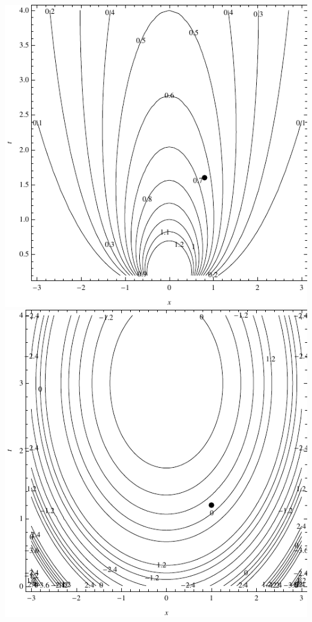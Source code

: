 \documentclass[12pt]{exam}
\begin{document}
\begin{questions}
\begin{parts}
\vspace{2ex}

\includegraphics[scale=0.75]{F2011_exam_2_fig1} \hspace{1.6em}
\includegraphics[scale=0.75]{F2011_exam_2_fig3}


\end{parts}
\end{questions}
\end{document}

